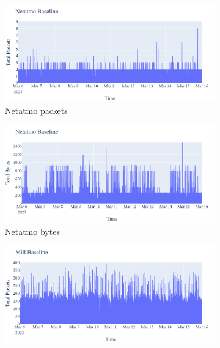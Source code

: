 \begin{figure}[H]
    \centering
    \begin{subfigure}[b]{0.4\textwidth}
        \centering
        \includegraphics[width=1\hsize]{figures/Netatmo_Baseline_TotalPackets.png}
        \caption{Netatmo packets}
    \end{subfigure}
    \begin{subfigure}[b]{0.4\textwidth}
        \centering
        \includegraphics[width=1\hsize]{figures/Netatmo_Baseline_TotalBytes.png}
        \caption{Netatmo bytes}
    \end{subfigure}
    \begin{subfigure}[b]{0.4\textwidth}
        \centering
        \includegraphics[width=1\hsize]{figures/Mill_Baseline_TotalPackets.png}

\end{subfigure}
\end{figure}

